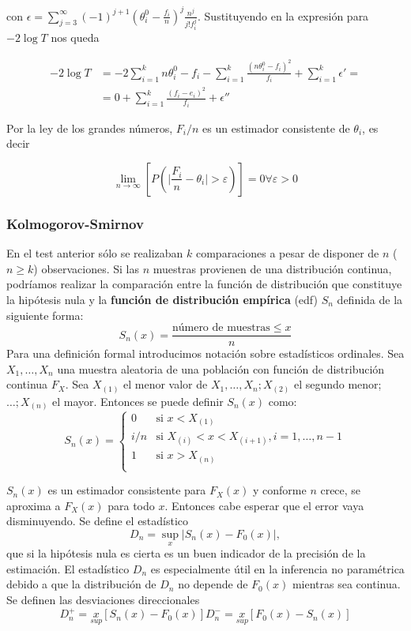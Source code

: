 	con $\epsilon = \sum\limits_{j=3}^\infty
			(-1)^{j+1} 
			\left( \theta_i^0 - \frac{f_i}{n}\right)^j
			\frac{n^j}{j!f_i^j}$. Sustituyendo en la expresión para $-2 \log T$ nos queda
			
	\begin{align*}
	-2 \log T &= 
		-2 \sum\limits_{i=1}^k n\theta_i^0 - f_i -
		\sum\limits_{i=1}^k 
			\frac{(n\theta_i^0 - f_i)^2}{f_i} + 
		\sum\limits_{i=1}^k \epsilon' = \\
	&= 0 + 
	   \sum\limits_{i=1}^k \frac{(f_i-e_i)^2}{f_i} +
	   \epsilon''	
	\end{align*}	 
	
	Por la ley de los grandes números, $F_i/n$ es un estimador consistente de $\theta_i$, es decir
	
	\[ \lim_{n \rightarrow \infty} \left[
			P \left(
				\vert \frac{F_i}{n} - \theta_i \vert 
					> \varepsilon
			\right) \right] = 0 \forall \varepsilon > 0 \]
	
	\subsubsection{Kolmogorov-Smirnov}
	
	En el test anterior sólo se realizaban $k$ comparaciones a pesar de disponer de $n$ ($n \geq k$) observaciones. Si las $n$ muestras provienen de una distribución continua, podríamos realizar la comparación entre la función de distribución que constituye la hipótesis nula y la \textbf{función de distribución empírica} (edf) $S_n$ definida de la siguiente forma:
	\[ S_n(x) = \frac{\text{número de muestras} \leq x}{n} \]
	Para una definición formal introducimos notación sobre estadísticos ordinales. Sea $X_1, \dots, X_n$ una muestra aleatoria de una población con función de distribución continua $F_X$. Sea $X_{(1)}$ el menor valor de $X_1, \dots, X_n; X_{(2)}$ el segundo menor;$ \dots; X_{(n)}$ el mayor. Entonces se puede definir $S_n(x)$ como:
	\[ S_n(x) = 
		\left\lbrace\begin{array}{ll}
			0 & \text{si } x < X_{(1)} \\
			i/n & \text{si } X_{(i)} < x <X_{(i+1)},
				i = 1, \dots, n-1 \\
			1 & \text{si } x > X_{(n)} \\
	\end{array}\right.
	\]
	
	$S_n(x)$ es un estimador consistente para $F_X(x)$ y conforme $n$ crece, se aproxima a $F_X(x)$ para todo $x$. Entonces cabe esperar que el error vaya disminuyendo. Se define el estadístico
	\[ D_n = \underset{x}{\sup} 
				\vert S_n(x) - F_0(x) \vert, \]
	que si la hipótesis nula es cierta es un buen indicador de la precisión de la estimación. El estadístico $D_n$ es especialmente útil en la inferencia no paramétrica debido a que la distribución de $D_n$ no depende de $F_0(x)$ mientras sea continua. Se definen las desviaciones direccionales
	\[ D_n^+ = \underset{sup}{x} [S_n(x) - F_0(x)]
		D_n^- = \underset{sup}{x} [F_0(x) - S_n(x)]\]
	
